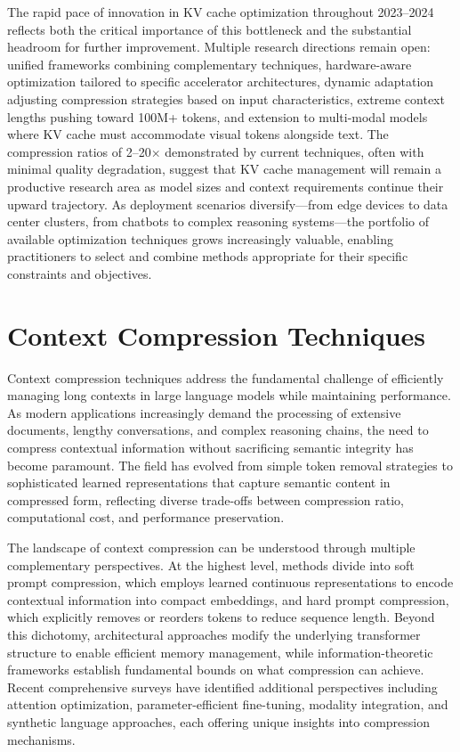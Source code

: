 \documentclass[11pt,letterpaper]{article}
\begin{document}
The rapid pace of innovation in KV cache optimization throughout 2023--2024 reflects both the critical importance of this bottleneck and the substantial headroom for further improvement. Multiple research directions remain open: unified frameworks combining complementary techniques, hardware-aware optimization tailored to specific accelerator architectures, dynamic adaptation adjusting compression strategies based on input characteristics, extreme context lengths pushing toward 100M+ tokens, and extension to multi-modal models where KV cache must accommodate visual tokens alongside text. The compression ratios of 2--20$\times$ demonstrated by current techniques, often with minimal quality degradation, suggest that KV cache management will remain a productive research area as model sizes and context requirements continue their upward trajectory. As deployment scenarios diversify---from edge devices to data center clusters, from chatbots to complex reasoning systems---the portfolio of available optimization techniques grows increasingly valuable, enabling practitioners to select and combine methods appropriate for their specific constraints and objectives.


\section{Context Compression Techniques}
\label{sec:compression}

Context compression techniques address the fundamental challenge of efficiently managing long contexts in large language models while maintaining performance. As modern applications increasingly demand the processing of extensive documents, lengthy conversations, and complex reasoning chains, the need to compress contextual information without sacrificing semantic integrity has become paramount. The field has evolved from simple token removal strategies to sophisticated learned representations that capture semantic content in compressed form, reflecting diverse trade-offs between compression ratio, computational cost, and performance preservation.

The landscape of context compression can be understood through multiple complementary perspectives. At the highest level, methods divide into soft prompt compression, which employs learned continuous representations to encode contextual information into compact embeddings, and hard prompt compression, which explicitly removes or reorders tokens to reduce sequence length. Beyond this dichotomy, architectural approaches modify the underlying transformer structure to enable efficient memory management, while information-theoretic frameworks establish fundamental bounds on what compression can achieve. Recent comprehensive surveys \cite{li2025prompt} have identified additional perspectives including attention optimization, parameter-efficient fine-tuning, modality integration, and synthetic language approaches, each offering unique insights into compression mechanisms.
\end{document}
